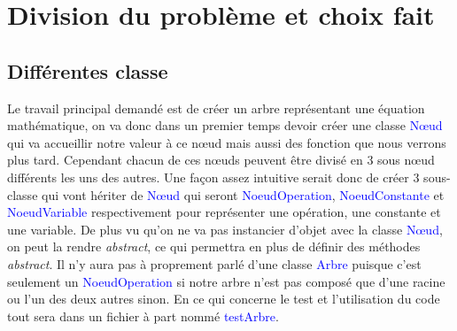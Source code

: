 \documentclass[a4paper]{article}
\renewcommand{\texttt}[2][blue]{\textcolor{#1}{\ttfamily #2}}
\begin{document}
\newpage
\begin{center}
  \tableofcontents
  \listoffigures
\end{center}

\newpage
  \section{Division du problème et choix fait}
  \label{sec:div_prob}

  \subsection{Différentes classe}
  \label{subsec:diff_class}


  \begin{multicols}{2}
  Le travail principal demandé est de créer un arbre représentant une équation mathématique, on va donc dans un premier temps devoir créer une classe \texttt{Nœud} qui va accueillir notre valeur à ce nœud mais aussi des fonction que nous verrons plus tard. Cependant chacun de ces nœuds peuvent être divisé en 3 sous nœud différents les uns des autres. Une façon assez intuitive serait donc de créer 3 sous-classe qui vont hériter de \texttt{Nœud} qui seront \texttt{NoeudOperation}, \texttt{NoeudConstante} et \texttt{NoeudVariable} respectivement pour représenter une opération, une constante et une variable. De plus vu qu'on ne va pas instancier d'objet avec la classe \texttt{Nœud}, on peut la rendre {\em abstract}, ce qui permettra en plus de définir des méthodes {\em abstract}. Il n'y aura pas à proprement parlé d'une classe \texttt{Arbre} puisque c'est seulement un \texttt{NoeudOperation} si notre arbre n'est pas composé que d'une racine ou l'un des deux autres sinon. En ce qui concerne le test et l'utilisation du code tout sera dans un fichier à part nommé \texttt{testArbre}.

\end{multicols}
\end{document}

